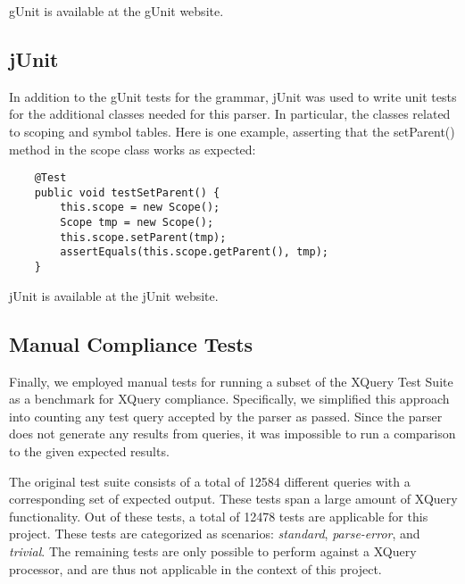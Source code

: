 gUnit is available at the gUnit website\cite{gunit00}.

\subsection{jUnit}
In addition to the gUnit tests for the grammar, jUnit was used to write unit tests for
the additional classes needed for this parser. In particular, the classes
related to scoping and symbol tables. Here is one example, asserting that the
setParent() method in the scope class works as expected:
\begin{Verbatim}
    @Test
    public void testSetParent() {
        this.scope = new Scope();
        Scope tmp = new Scope();
        this.scope.setParent(tmp);
        assertEquals(this.scope.getParent(), tmp);
    }
\end{Verbatim}

jUnit is available at the jUnit website\cite{junit_website}.

\subsection{Manual Compliance Tests}
Finally, we employed manual tests for running a subset of the XQuery Test
Suite\cite{w3c05} as a benchmark for XQuery compliance. Specifically, we
simplified this approach into counting any test query accepted by the parser as
passed. Since the parser does not generate any results from queries, it was
impossible to run a comparison to the given expected results.

The original test suite consists of a total of 12584 different queries with a
corresponding set of expected output. These tests span a large amount of XQuery
functionality. Out of these tests, a total of 12478 tests are applicable for
this project. These tests are categorized as scenarios: \emph{standard}, 
\emph{parse-error}, and \emph{trivial}. The remaining tests are only possible to
perform against a XQuery processor, and are thus not applicable in the context of this project.
